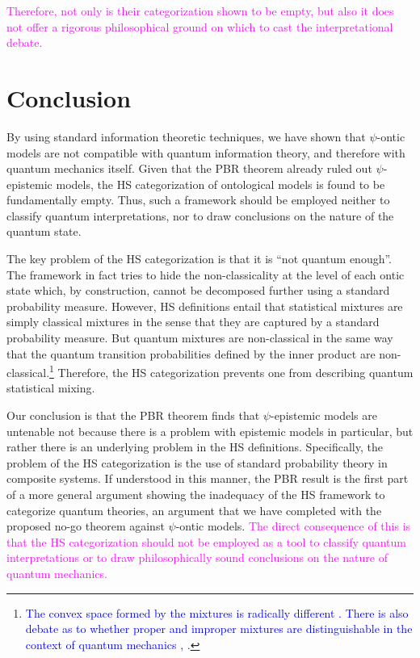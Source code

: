 \documentclass[10pt,twocolumn, nofootinbib]{revtex4-2}
\begin{document}
\textcolor{magenta}{Therefore, not only is their categorization shown to be empty, but also it does not offer a rigorous philosophical ground on which to cast the interpretational debate.}

\section{Conclusion}

By using standard information theoretic techniques, we have shown that $\psi$-ontic models are not compatible with quantum information theory, and therefore with quantum mechanics itself. Given that the PBR theorem already ruled out $\psi$-epistemic models, the HS categorization of ontological models is found to be fundamentally empty. Thus, such a framework should be employed neither to classify quantum interpretations, nor to draw conclusions on the nature of the quantum state.

The key problem of the HS categorization is that it is ``not quantum enough''. The framework in fact tries to hide the non-classicality at the level of each ontic state which, by construction, cannot be decomposed further using a standard probability measure. However, HS definitions entail that statistical mixtures are simply classical mixtures in the sense that they are captured by a standard probability measure. But quantum mixtures are non-classical in the same way that the quantum transition probabilities defined by the inner product are non-classical.\footnote{\textcolor{blue}{The convex space formed by the mixtures is radically different \cite{Bengtsson:2017}. There is also debate as to whether proper and improper mixtures are distinguishable in the context of quantum mechanics \cite{Kirkpatrick:2001}, \cite{DEspagnat:2001}.}} Therefore, the HS categorization prevents one from describing quantum statistical mixing.

Our conclusion is that the PBR theorem finds that $\psi$-epistemic models are untenable not because there is a problem with epistemic models in particular, but rather there is an underlying problem in the HS definitions. Specifically, the problem of the HS categorization is the use of standard probability theory in composite systems. If understood in this manner, the PBR result is the first part of a more general argument showing the inadequacy of the HS framework to categorize quantum theories, an argument that we have completed with the proposed no-go theorem against $\psi$-ontic models. \textcolor{magenta}{The direct consequence of this is that the HS categorization should not be employed as a tool to classify quantum interpretations or to draw philosophically sound conclusions on the nature of quantum mechanics.}
\end{document}
